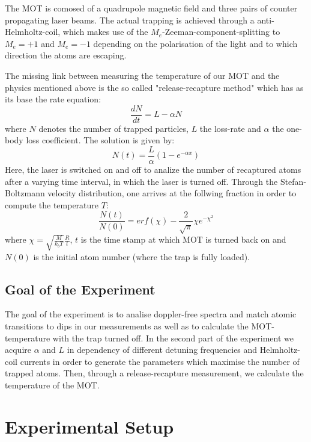 \documentclass[12pt, a4paper]{article}
\begin{document}
The MOT is comosed of a quadrupole magnetic field and three pairs of counter propagating laser beams.
The actual trapping is achieved through a anti-Helmholtz-coil, which makes use of the $M_e$-Zeeman-component-splitting to $M_e = +1$ and $M_e = -1$ depending on the polarisation of the light and to which direction the atoms are escaping.

The missing link between measuring the temperature of our MOT and the physics mentioned above is the so called "release-recapture method" which has as its base the rate equation:
\begin{equation}
\frac{dN}{dt} = L - \alpha N
\end{equation}
where $N$ denotes the number of trapped particles, $L$ the loss-rate and $\alpha$ the one-body loss coefficient. The solution is given by:
\begin{equation}
N(t) = \frac{L}{\alpha}(1-e^{-\alpha x})
\end{equation}
Here, the laser is switched on and off to analize the number of recaptured atoms after a varying time interval, in which the laser is turned off.
Through the Stefan-Boltzmann velocity distribution, one arrives at the follwing fraction in order to compute the temperature $T$:
\begin{equation}
\frac{N(t)}{N(0)} = erf(\chi) - \frac{2}{\sqrt{\pi}} \chi e^{-\chi ^2}
\end{equation}
where $\chi = \sqrt{\frac{M}{k_{b} T}}\frac{R}{t}$, $t$ is the time stamp at which MOT is turned back on and $N(0)$ is the initial atom number (where the trap is fully loaded). \cite{script}


\subsection{Goal of the Experiment}
The goal of the experiment is to analise doppler-free spectra and match atomic transitions to dips in our measurements as well as to calculate the MOT-temperature with the trap turned off. In the second part of the experiment we acquire $\alpha$ and $L$ in dependency of different detuning frequencies and Helmholtz-coil currents in order to generate the parameters which maximise the number of trapped atoms. Then, through a release-recapture measurement, we calculate the temperature of the MOT.


\section{Experimental Setup}
\end{document}
